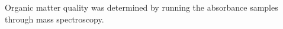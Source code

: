 Organic matter quality was determined by running the absorbance samples through mass spectroscopy.  